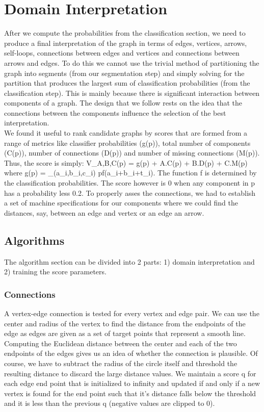 \section{Domain Interpretation}

After we compute the probabilities from the classification section, we need to produce a final interpretation of the graph in terms of edges, vertices, arrows, self-loops, connections between edges and vertices and connections between arrows and edges. To do this we cannot use the trivial method of partitioning the graph into segments (from our segmentation step) and  simply solving for the partition that produces the largest sum of classification probabilities (from the classification step). This is mainly because there is significant interaction between components of a graph. The design that we follow rests on the idea that the connections between the components influence the selection of the best interpretation.\\

We found it useful to rank candidate graphs by scores that are formed from a range of metrics like classifier probabilities (g(p)), total number of components (C(p)), number of connections (D(p)) and number of missing connections (M(p)). Thus, the score is simply: V_{A,B,C}(p) = g(p) + A.C(p) + B.D(p) + C.M(p) where g(p) = \sum_{(a_i,b_i,c_i) \in p}f(a_i+b_i+t_i). The function f is determined by the  classification probabilities. The score however is 0 when any component in p has a probability less 0.2. To properly asses the connections, we had to establish a set of machine specifications for our components where we could find the distances, say, between an edge and vertex or an edge an arrow.\\

\subsection{Algorithms}

The algorithm section can be divided into 2 parts: 1) domain interpretation and 2) training the score parameters.\\

\subsubsection{Connections}

A vertex-edge connection is tested for every vertex and edge pair. We can use the center and radius of the vertex to find the distance from the endpoints of the edge as edges are given as a set of target points that represent a smooth line. Computing the Euclidean distance between the center and each of the two endpoints of the edges gives us an idea of whether the connection is plausible. Of course, we have to subtract the radius of the circle itself and threshold the resulting distance to discard the large distance values. We maintain a score q for each edge end point that is initialized to infinity and updated if and only if a new vertex is found for the end point such that it's distance falls below the threshold and it is less than the previous q (negative values are clipped to 0).\\

